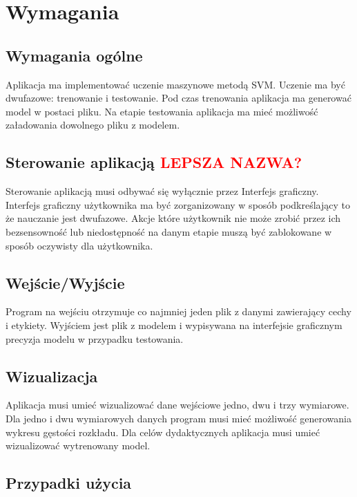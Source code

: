 \documentclass[paper=a4, fontsize=11pt]{scrartcl} %
\numberwithin{equation}{section} %
\numberwithin{figure}{section} %
\begin{document}
\newpage
\section{Wymagania} %
\subsection{Wymagania ogólne}
    \par Aplikacja ma implementować uczenie maszynowe metodą SVM. Uczenie ma być dwufazowe:
    trenowanie i testowanie. Pod czas trenowania aplikacja ma generować model w postaci pliku.
    Na etapie testowania aplikacja ma mieć możliwość załadowania dowolnego pliku z modelem.

\subsection{Sterowanie aplikacją \textbf{\textcolor{red}{LEPSZA NAZWA?}}} %
    \par Sterowanie aplikacją musi odbywać się wyłącznie przez Interfejs graficzny. Interfejs
    graficzny użytkownika ma być zorganizowany w sposób podkreślający to że nauczanie jest
    dwufazowe. Akcje które użytkownik nie może zrobić przez ich bezsensowność lub
    niedostępność na danym etapie muszą być zablokowane w sposób oczywisty dla użytkownika.

\subsection{Wejście/Wyjście}
    \par Program na wejściu otrzymuje co najmniej jeden plik z danymi zawierający cechy i
    etykiety. Wyjściem jest plik z modelem i wypisywana na interfejsie graficznym precyzja
    modelu w przypadku testowania. 

\subsection{Wizualizacja}
    \par Aplikacja musi umieć wizualizować dane wejściowe jedno, dwu i trzy wymiarowe. Dla
    jedno i dwu wymiarowych danych program musi mieć możliwość generowania wykresu gęstości
    rozkładu. Dla celów dydaktycznych aplikacja musi umieć wizualizować wytrenowany model.

\subsection{Przypadki użycia}
\end{document}
